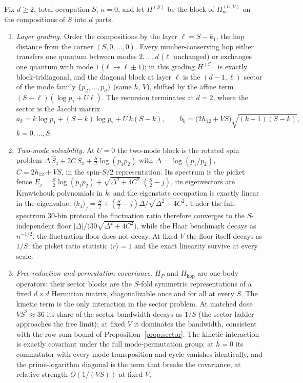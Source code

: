 \begin{proposition}\label{prop:jacobi}
Fix $d\ge2$, total occupation $S$, $\kappa=0$, and let $H^{(S)}$ be the block of
$H_{\mathrm{nc}}^{(U,V)}$ on the compositions of $S$ into $d$ parts.
\begin{enumerate}[leftmargin=1.6em]
\item \emph{Layer grading.} Order the compositions by the layer
$\ell=S-k_{1}$, the hop distance from the corner $(S,0,\dots,0)$. Every
number-conserving hop either transfers one quantum between modes $2,\dots,d$
($\ell$ unchanged) or exchanges one quantum with mode $1$ ($\ell\to\ell\pm1$);
in this grading $H^{(S)}$ is exactly block-tridiagonal, and the diagonal block
at layer $\ell$ is the $(d-1,\ell)$ sector of the mode family
$\{p_{2},\dots,p_{d}\}$ (same $h$, $V$), shifted by the affine term
$(S-\ell)(\log p_{1}+U\ell)$. The recursion terminates at $d=2$, where the
sector is the Jacobi matrix
\begin{equation*}
a_k=k\log p_{1}+(S-k)\log p_{2}+U\,k(S-k),\qquad
b_k=\bigl(2h_{12}+VS\bigr)\sqrt{(k+1)(S-k)} ,
\end{equation*}
$k=0,\dots,S$.
\item \emph{Two-mode solvability.} At $U=0$ the two-mode block is the
rotated spin problem
$\Delta\,\hat S_{z}+2C\,\hat S_{x}+\tfrac{S}{2}\log(p_{1}p_{2})$ with
$\Delta=\log(p_{1}/p_{2})$, $C=2h_{12}+VS$, in the spin-$S/2$
representation. Its spectrum is the picket fence
$E_j=\tfrac{S}{2}\log(p_{1}p_{2})+\sqrt{\Delta^{2}+4C^{2}}\;(\tfrac{S}{2}-j)$,
its eigenvectors are Krawtchouk polynomials in $k$, and the eigenstate
occupation is exactly linear in the eigenvalue,
$\langle k_{1}\rangle_j=\tfrac{S}{2}+(\tfrac{S}{2}-j)\Delta/\sqrt{\Delta^{2}+4C^{2}}$.
Under the full-spectrum $30$-bin protocol the fluctuation ratio therefore
converges to the $S$-independent floor
$|\Delta|/\bigl(30\sqrt{\Delta^{2}+4C^{2}}\bigr)$, while the Haar benchmark
decays as $n^{-1/2}$: the fluctuation floor does not decay. At fixed $V$ the
floor itself decays as $1/S$; the picket ratio statistic $\langle
r\rangle=1$ and the exact linearity survive at every scale.
\item \emph{Free reduction and permutation covariance.} $H_{P}$ and
$H_{\mathrm{hop}}$ are one-body operators: their sector blocks are the
$S$-fold symmetric representations of a fixed $d\times d$ Hermitian matrix,
diagonalizable once and for all at every $S$. The kinetic term is the only
interaction in the sector problem. At matched dose $VS^{2}\approx36$ its
share of the sector bandwidth decays as $1/S$ (the sector ladder approaches
the free limit); at fixed $V$ it dominates the bandwidth, consistent with
the row-sum bound of Proposition~\ref{prop:sector}. The kinetic interaction
is exactly covariant under the full mode-permutation group: at $h=0$ its
commutator with every mode transposition and cycle vanishes identically,
and the prime-logarithm diagonal is the term that breaks the covariance, at
relative strength $O(1/(VS))$ at fixed $V$.
\end{enumerate}
\end{proposition}

